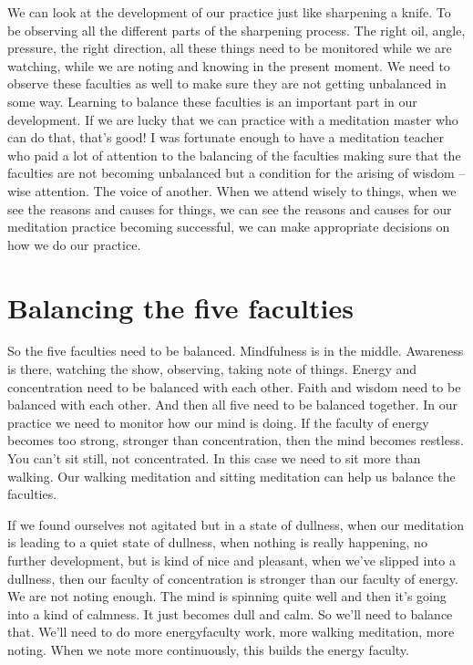 \documentclass[letterpaper,10pt,english]{sphinxmanual}
\begin{document}
\sphinxAtStartPar
We  can  look  at  the  development  of  our  practice  just  like  sharpening
a  knife.  To  be  observing  all  the  different  parts  of  the  sharpening  process.
The  right  oil,  angle,  pressure,  the  right  direction,  all  these  things  need  to
be monitored while we are watching, while we are noting and knowing in
the  present  moment.  We  need  to  observe  these  faculties  as  well  to  make
sure they are not getting unbalanced in some way. Learning to balance these
faculties is an important part in our development. If we are lucky that we
can practice with a meditation master who can do that, that’s good! I was
fortunate enough to have a meditation teacher who paid a lot of attention to
the balancing of the faculties making sure that the faculties are not becoming
unbalanced but a condition for the arising of wisdom – wise attention. The
voice of another. When we attend wisely to things, when we see the reasons
and causes for things, we can see the reasons and causes for our meditation
practice  becoming  successful,  we  can  make  appropriate  decisions  on  how
we do our practice.


\section{Balancing the five faculties}
\label{\detokenize{5-a:balancing-the-five-faculties}}
\sphinxAtStartPar
{} So the five faculties need to be balanced. Mindfulness is in the middle.
Awareness  is  there,  watching  the  show,  observing,  taking  note  of  things.
Energy  and  concentration  need  to  be  balanced  with  each  other.  Faith  and
wisdom need to be balanced with each other. And then all five need to be
balanced together. In our practice we need to monitor how our mind is doing.
If the faculty of energy becomes too strong, stronger than concentration,  then  the  mind  becomes  restless. You  can’t  sit  still,  not  concentrated.
In this case we need to sit more than walking. Our walking meditation and
sitting meditation can help us balance the faculties.

\sphinxAtStartPar
If we found ourselves not agitated but in a state of dullness, when our
meditation  is  leading  to  a  quiet  state  of  dullness,  when  nothing  is  really
happening, no further development, but is kind of nice and pleasant, when
we’ve slipped into a dullness, then our faculty of concentration is stronger
than our faculty of energy. We are not noting enough. The mind is spinning
quite well and then it’s going into a kind of calmness. It just becomes dull
and  calm.  So  we’ll  need  to  balance  that.  We’ll  need  to  do  more  energyfaculty work, more walking meditation, more noting. When we note more
continuously, this builds the energy faculty.
\end{document}
